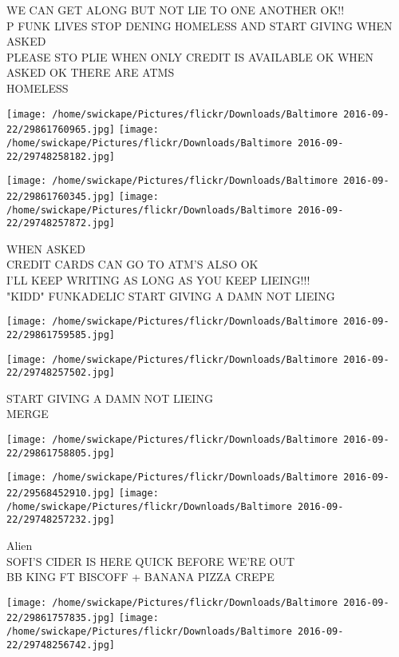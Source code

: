 \documentclass[10pt,letterpaper]{article}
\begin{document}
WE CAN GET ALONG BUT NOT LIE TO ONE ANOTHER OK!!\\
P FUNK LIVES STOP DENING HOMELESS AND START GIVING WHEN ASKED\\
PLEASE STO PLIE WHEN ONLY CREDIT IS AVAILABLE OK WHEN ASKED OK THERE ARE ATMS\\
HOMELESS
\pagebreak

\texttt{[image: /home/swickape/Pictures/flickr/Downloads/Baltimore 2016-09-22/29861760965.jpg]}
\texttt{[image: /home/swickape/Pictures/flickr/Downloads/Baltimore 2016-09-22/29748258182.jpg]}

\texttt{[image: /home/swickape/Pictures/flickr/Downloads/Baltimore 2016-09-22/29861760345.jpg]}
\texttt{[image: /home/swickape/Pictures/flickr/Downloads/Baltimore 2016-09-22/29748257872.jpg]}

WHEN ASKED\\
CREDIT CARDS CAN GO TO ATM'S ALSO OK\\
I'LL KEEP WRITING AS LONG AS YOU KEEP LIEING!!!\\
"KIDD" FUNKADELIC START GIVING A DAMN NOT LIEING
\pagebreak

\texttt{[image: /home/swickape/Pictures/flickr/Downloads/Baltimore 2016-09-22/29861759585.jpg]}

\vspace{0.25in}
\texttt{[image: /home/swickape/Pictures/flickr/Downloads/Baltimore 2016-09-22/29748257502.jpg]}

START GIVING A DAMN NOT LIEING\\
MERGE
\pagebreak

\texttt{[image: /home/swickape/Pictures/flickr/Downloads/Baltimore 2016-09-22/29861758805.jpg]}

\vspace{0.25in}
\texttt{[image: /home/swickape/Pictures/flickr/Downloads/Baltimore 2016-09-22/29568452910.jpg]}
\texttt{[image: /home/swickape/Pictures/flickr/Downloads/Baltimore 2016-09-22/29748257232.jpg]}

Alien\\
SOFI'S CIDER IS HERE QUICK BEFORE WE'RE OUT\\
BB KING FT BISCOFF + BANANA PIZZA CREPE
\pagebreak

\texttt{[image: /home/swickape/Pictures/flickr/Downloads/Baltimore 2016-09-22/29861757835.jpg]}
\texttt{[image: /home/swickape/Pictures/flickr/Downloads/Baltimore 2016-09-22/29748256742.jpg]}
\end{document}
